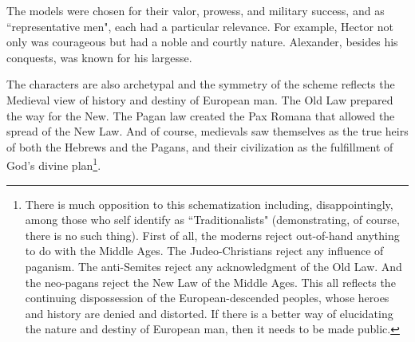 The models were chosen for their valor, prowess, and military success, and as ``representative men", each had a particular relevance. For example, Hector not only was courageous but had a noble and courtly nature. Alexander, besides his conquests, was known for his largesse. 

The characters are also archetypal and the symmetry of the scheme reflects the Medieval view of history and destiny of European man. The Old Law prepared the way for the New. The Pagan law created the Pax Romana that allowed the spread of the New Law. And of course, medievals saw themselves as the true heirs of both the Hebrews and the Pagans, and their civilization as the fulfillment of God's divine plan\footnote{There is much opposition to this schematization including, disappointingly, among those who self identify as ``Traditionalists" (demonstrating, of course, there is no such thing). First of all, the moderns reject out-of-hand anything to do with the Middle Ages. The Judeo-Christians reject any influence of paganism. The anti-Semites reject any acknowledgment of the Old Law. And the neo-pagans reject the New Law of the Middle Ages. This all reflects the continuing dispossession of the European-descended peoples, whose heroes and history are denied and distorted. If there is a better way of elucidating the nature and destiny of European man, then it needs to be made public.}. 

